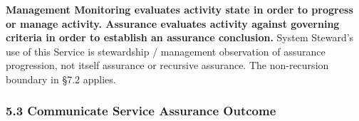 \textbf{Management Monitoring evaluates activity state in order to progress or manage activity. Assurance evaluates activity against governing criteria in order to establish an assurance conclusion.} System Steward's use of this Service is stewardship /\allowbreak{} management observation of assurance progression, not itself assurance or recursive assurance. The non-recursion boundary in §7.2 applies.

\label{rad:assurance:187}



\label{rad:assurance:189}
\subsubsection*{5.3 Communicate Service Assurance Outcome}
\label{rad:assurance:191}

